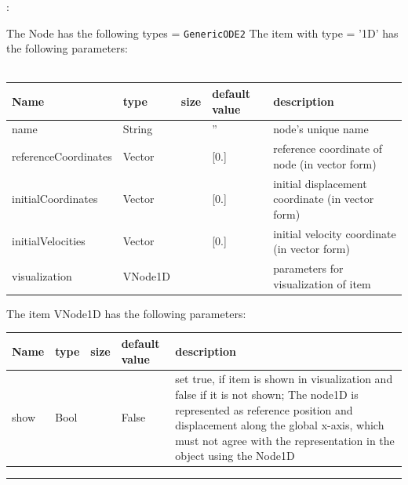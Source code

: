 \noindent {}:
\bi
  \item The Node has the following types = \texttt{GenericODE2}
\ei\vspace{12pt} \noindent 
The item  with type = '1D' has the following parameters:
\vspace{-0.5cm}\\
\vspace{-0.5cm}\\
\begin{center}
  \footnotesize
  \begin{longtable}{| p{4.5cm} | p{2.5cm} | p{0.5cm} | p{2.5cm} | p{6cm} |}
    \hline
    \bf Name & \bf type & \bf size & \bf default value & \bf description \\ \hline
    name &     String &      &     '' &     node's unique name\\ \hline
    referenceCoordinates &     Vector &      &     [0.] &     reference coordinate of node (in vector form)\\ \hline
    initialCoordinates &     Vector &      &     [0.] &     initial displacement coordinate (in vector form)\\ \hline
    initialVelocities &     Vector &      &     [0.] &     initial velocity coordinate (in vector form)\\ \hline
    visualization &     VNode1D &      &      &     parameters for visualization of item\\ \hline
\end{longtable}
\end{center}

\noindent The item VNode1D has the following parameters:
\begin{center}
  \footnotesize
  \begin{longtable}{| p{4.5cm} | p{2.5cm} | p{0.5cm} | p{2.5cm} | p{6cm} |}
    \hline
    \bf Name & \bf type & \bf size & \bf default value & \bf description \\ \hline
    show &     Bool &      &     False &     set true, if item is shown in visualization and false if it is not shown; The node1D is represented as reference position and displacement along the global x-axis, which must not agree with the representation in the object using the Node1D\\ \hline
\end{longtable}
\end{center}
\par\noindent\rule{\textwidth}{0.4pt}
\label{description_Node1D}
